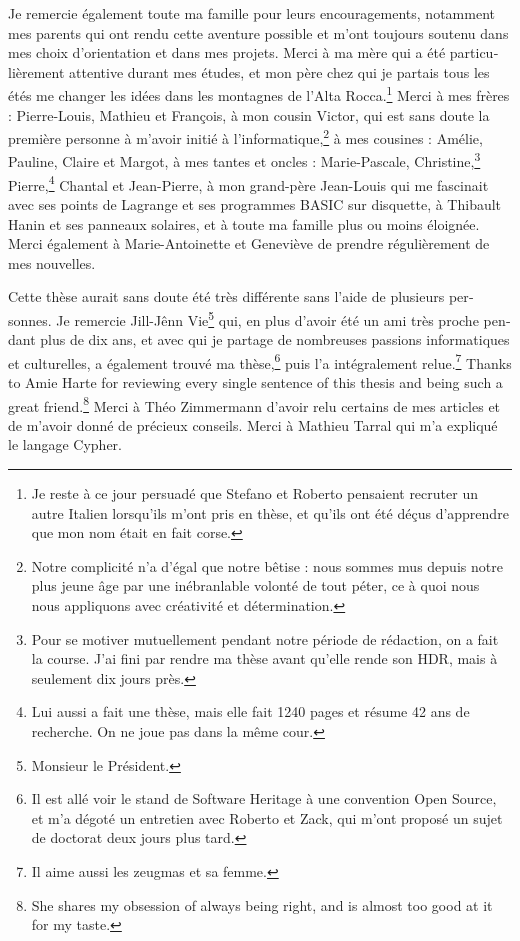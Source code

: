 \begin{otherlanguage}{french}
\begin{SingleSpace}
  Je remercie également toute ma famille pour leurs encouragements, notamment
  mes parents qui ont rendu cette aventure possible et m'ont toujours soutenu
  dans mes choix d'orientation et dans mes projets. Merci à ma mère qui a été
  particulièrement attentive durant mes études, et mon père chez qui je partais
  tous les étés me changer les idées dans les montagnes de l'Alta
  Rocca.\footnote{Je reste à ce jour persuadé que Stefano et Roberto pensaient
  recruter un autre Italien lorsqu'ils m'ont pris en thèse, et qu'ils ont été
  déçus d'apprendre que mon nom était en fait corse.}
  Merci à mes frères : Pierre-Louis, Mathieu et François,
  à mon cousin Victor,
  qui est sans doute la première personne à m'avoir initié à
  l'informatique,\footnote{Notre complicité n'a d'égal que notre bêtise : nous
  sommes mus depuis notre plus jeune âge par une inébranlable volonté de tout
  péter, ce à quoi nous nous appliquons avec créativité et détermination.}
  à mes cousines : Amélie, Pauline, Claire et Margot,
  à mes tantes et oncles : Marie-Pascale, Christine,\footnote{Pour
  se motiver mutuellement pendant notre période de rédaction, on a fait la
  course. J'ai fini par rendre ma thèse avant qu'elle rende son HDR, mais à
  seulement dix jours près.}
  Pierre,\footnote{Lui aussi a fait une thèse, mais elle fait 1240
  pages et résume 42 ans de recherche. On ne joue pas dans la même cour.}
  Chantal et Jean-Pierre, à mon grand-père Jean-Louis qui me fascinait
  avec ses points de Lagrange et ses programmes BASIC sur disquette, à Thibault
  Hanin et ses panneaux solaires, et à toute ma famille plus ou moins éloignée.
  Merci également à Marie-Antoinette et Geneviève de prendre régulièrement de
  mes nouvelles.

  Cette thèse aurait sans doute été très différente sans l'aide de plusieurs
  personnes. Je remercie Jill-Jênn Vie\footnote{Monsieur le Président.} qui, en
  plus d'avoir été un ami très proche pendant plus de dix ans, et avec qui je
  partage de nombreuses passions informatiques et culturelles, a également
  trouvé ma thèse,\footnote{Il est allé voir le stand de Software Heritage à
  une convention Open Source, et m'a dégoté un entretien avec Roberto et Zack,
  qui m'ont proposé un sujet de doctorat deux jours plus tard.} puis l'a
  intégralement relue.\footnote{Il aime aussi les zeugmas et sa femme.}
  Thanks to Amie Harte for reviewing every single sentence of this thesis and
  being such a great friend.\footnote{She shares my obsession of always being
  right, and is almost too good at it for my taste.} Merci à Théo Zimmermann
  d'avoir relu certains de mes articles et de m'avoir donné de précieux
  conseils. Merci à Mathieu Tarral qui m'a expliqué le langage Cypher.


\end{SingleSpace}
\end{otherlanguage}
